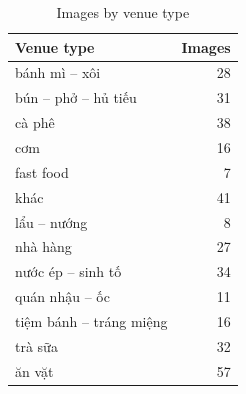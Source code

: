 \begin{table}[t]
\centering
\caption{Images by venue type}
\label{tab:venuetype}
\small
\begin{tabular}{lr}
\toprule
Venue type & Images \\
\midrule
bánh mì – xôi & 28 \\
bún – phở – hủ tiếu & 31 \\
cà phê & 38 \\
cơm & 16 \\
fast food & 7 \\
khác & 41 \\
lẩu – nướng & 8 \\
nhà hàng & 27 \\
nước ép – sinh tố & 34 \\
quán nhậu – ốc & 11 \\
tiệm bánh – tráng miệng & 16 \\
trà sữa & 32 \\
ăn vặt & 57 \\
\bottomrule
\end{tabular}
\end{table}

